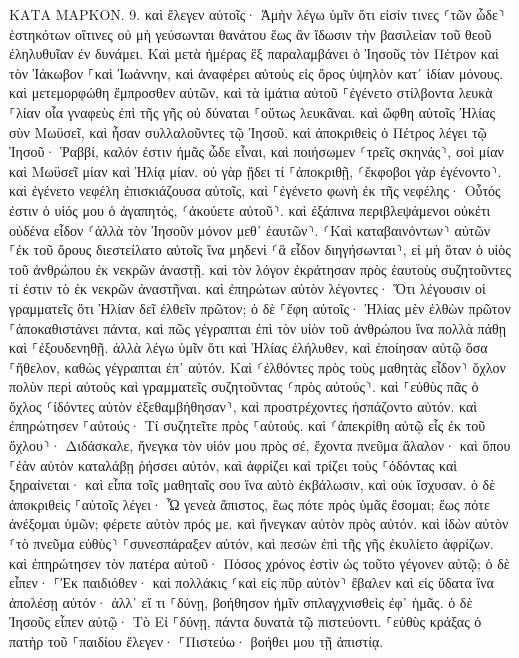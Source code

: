 \documentclass[twoside, 9pt]{extreport}
\begin{document}
ΚΑΤΑ ΜΑΡΚΟΝ.
9.
καὶ ἔλεγεν αὐτοῖς· Ἀμὴν λέγω ὑμῖν ὅτι εἰσίν τινες ⸂τῶν ὧδε⸃ ἑστηκότων οἵτινες οὐ μὴ γεύσωνται θανάτου ἕως ἂν ἴδωσιν τὴν βασιλείαν τοῦ θεοῦ ἐληλυθυῖαν ἐν δυνάμει. 
Καὶ μετὰ ἡμέρας ἓξ παραλαμβάνει ὁ Ἰησοῦς τὸν Πέτρον καὶ τὸν Ἰάκωβον ⸀καὶ Ἰωάννην, καὶ ἀναφέρει αὐτοὺς εἰς ὄρος ὑψηλὸν κατ᾽ ἰδίαν μόνους. καὶ μετεμορφώθη ἔμπροσθεν αὐτῶν, 
καὶ τὰ ἱμάτια αὐτοῦ ⸀ἐγένετο στίλβοντα λευκὰ ⸀λίαν οἷα γναφεὺς ἐπὶ τῆς γῆς οὐ δύναται ⸀οὕτως λευκᾶναι. 
καὶ ὤφθη αὐτοῖς Ἠλίας σὺν Μωϋσεῖ, καὶ ἦσαν συλλαλοῦντες τῷ Ἰησοῦ. 
καὶ ἀποκριθεὶς ὁ Πέτρος λέγει τῷ Ἰησοῦ· Ῥαββί, καλόν ἐστιν ἡμᾶς ὧδε εἶναι, καὶ ποιήσωμεν ⸂τρεῖς σκηνάς⸃, σοὶ μίαν καὶ Μωϋσεῖ μίαν καὶ Ἠλίᾳ μίαν. 
οὐ γὰρ ᾔδει τί ⸀ἀποκριθῇ, ⸂ἔκφοβοι γὰρ ἐγένοντο⸃. 
καὶ ἐγένετο νεφέλη ἐπισκιάζουσα αὐτοῖς, καὶ ⸀ἐγένετο φωνὴ ἐκ τῆς νεφέλης· Οὗτός ἐστιν ὁ υἱός μου ὁ ἀγαπητός, ⸂ἀκούετε αὐτοῦ⸃. 
καὶ ἐξάπινα περιβλεψάμενοι οὐκέτι οὐδένα εἶδον ⸂ἀλλὰ τὸν Ἰησοῦν μόνον μεθ᾽ ἑαυτῶν⸃. 
⸂Καὶ καταβαινόντων⸃ αὐτῶν ⸀ἐκ τοῦ ὄρους διεστείλατο αὐτοῖς ἵνα μηδενὶ ⸂ἃ εἶδον διηγήσωνται⸃, εἰ μὴ ὅταν ὁ υἱὸς τοῦ ἀνθρώπου ἐκ νεκρῶν ἀναστῇ. 
καὶ τὸν λόγον ἐκράτησαν πρὸς ἑαυτοὺς συζητοῦντες τί ἐστιν τὸ ἐκ νεκρῶν ἀναστῆναι. 
καὶ ἐπηρώτων αὐτὸν λέγοντες· Ὅτι λέγουσιν οἱ γραμματεῖς ὅτι Ἠλίαν δεῖ ἐλθεῖν πρῶτον; 
ὁ δὲ ⸀ἔφη αὐτοῖς· Ἠλίας μὲν ἐλθὼν πρῶτον ⸀ἀποκαθιστάνει πάντα, καὶ πῶς γέγραπται ἐπὶ τὸν υἱὸν τοῦ ἀνθρώπου ἵνα πολλὰ πάθῃ καὶ ⸀ἐξουδενηθῇ. 
ἀλλὰ λέγω ὑμῖν ὅτι καὶ Ἠλίας ἐλήλυθεν, καὶ ἐποίησαν αὐτῷ ὅσα ⸀ἤθελον, καθὼς γέγραπται ἐπ᾽ αὐτόν. 
Καὶ ⸂ἐλθόντες πρὸς τοὺς μαθητὰς εἶδον⸃ ὄχλον πολὺν περὶ αὐτοὺς καὶ γραμματεῖς συζητοῦντας ⸂πρὸς αὐτούς⸃. 
καὶ ⸀εὐθὺς πᾶς ὁ ὄχλος ⸂ἰδόντες αὐτὸν ἐξεθαμβήθησαν⸃, καὶ προστρέχοντες ἠσπάζοντο αὐτόν. 
καὶ ἐπηρώτησεν ⸀αὐτούς· Τί συζητεῖτε πρὸς ⸀αὑτούς. 
καὶ ⸂ἀπεκρίθη αὐτῷ εἷς ἐκ τοῦ ὄχλου⸃· Διδάσκαλε, ἤνεγκα τὸν υἱόν μου πρὸς σέ, ἔχοντα πνεῦμα ἄλαλον· 
καὶ ὅπου ⸀ἐὰν αὐτὸν καταλάβῃ ῥήσσει αὐτόν, καὶ ἀφρίζει καὶ τρίζει τοὺς ⸀ὀδόντας καὶ ξηραίνεται· καὶ εἶπα τοῖς μαθηταῖς σου ἵνα αὐτὸ ἐκβάλωσιν, καὶ οὐκ ἴσχυσαν. 
ὁ δὲ ἀποκριθεὶς ⸀αὐτοῖς λέγει· Ὦ γενεὰ ἄπιστος, ἕως πότε πρὸς ὑμᾶς ἔσομαι; ἕως πότε ἀνέξομαι ὑμῶν; φέρετε αὐτὸν πρός με. 
καὶ ἤνεγκαν αὐτὸν πρὸς αὐτόν. καὶ ἰδὼν αὐτὸν ⸂τὸ πνεῦμα εὐθὺς⸃ ⸀συνεσπάραξεν αὐτόν, καὶ πεσὼν ἐπὶ τῆς γῆς ἐκυλίετο ἀφρίζων. 
καὶ ἐπηρώτησεν τὸν πατέρα αὐτοῦ· Πόσος χρόνος ἐστὶν ὡς τοῦτο γέγονεν αὐτῷ; ὁ δὲ εἶπεν· ⸀Ἐκ παιδιόθεν· 
καὶ πολλάκις ⸂καὶ εἰς πῦρ αὐτὸν⸃ ἔβαλεν καὶ εἰς ὕδατα ἵνα ἀπολέσῃ αὐτόν· ἀλλ᾽ εἴ τι ⸀δύνῃ, βοήθησον ἡμῖν σπλαγχνισθεὶς ἐφ᾽ ἡμᾶς. 
ὁ δὲ Ἰησοῦς εἶπεν αὐτῷ· Τὸ Εἰ ⸀δύνῃ, πάντα δυνατὰ τῷ πιστεύοντι. 
⸀εὐθὺς κράξας ὁ πατὴρ τοῦ ⸀παιδίου ἔλεγεν· ⸀Πιστεύω· βοήθει μου τῇ ἀπιστίᾳ. 
\end{document}
